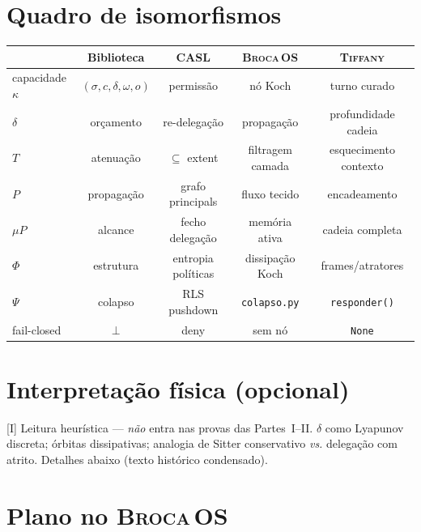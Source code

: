 \documentclass[11pt]{article}
\newcommand{\est}[1]{\textsf{\footnotesize[#1]}}
\newcommand{\SO}{\textsc{Broca\,OS}}
\newcommand{\Tiffany}{\textsc{Tiffany}}
\theoremstyle{definition}
\newcommand{\dep}{\delta}
\newcommand{\Phif}{\Phi}
\begin{document}
  \section{Quadro de isomorfismos}\label{ap:iso}

  \begin{center}
  \small
  \renewcommand{\arraystretch}{1.3}
  \begin{tabular}{@{}lcccc@{}}
    \toprule
    & \textbf{Biblioteca} & \textbf{CASL} & \textbf{\SO} & \textbf{\Tiffany} \\
    \midrule
    capacidade $\kappa$ & $(\sigma,c,\dep,\omega,o)$ & permissão & nó Koch & turno curado \\
    $\dep$ & orçamento & re-delegação & propagação & profundidade cadeia \\
    $T$ & atenuação & $\subseteq$ extent & filtragem camada & esquecimento contexto \\
    $P$ & propagação & grafo principals & fluxo tecido & encadeamento \\
    $\mu P$ & alcance & fecho delegação & memória ativa & cadeia completa \\
    $\Phif$ & estrutura & entropia políticas & dissipação Koch & frames/atratores \\
    $\Psi$ & colapso & RLS pushdown & \texttt{colapso.py} & \texttt{responder()} \\
    fail-closed & $\bot$ & deny & sem nó & \texttt{None} \\
    \bottomrule
  \end{tabular}
  \end{center}

  \section{Interpretação física (opcional)}\label{ap:fisica}

  \est{I} Leitura heurística --- \emph{não} entra nas provas das Partes~I--II.
  $\dep$ como Lyapunov discreta; órbitas dissipativas; analogia de Sitter
  conservativo \emph{vs.} delegação com atrito. Detalhes abaixo (texto
  histórico condensado).

  

  \section{Plano no \SO}\label{ap:plano}
\end{document}
